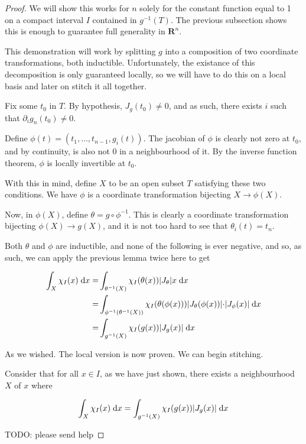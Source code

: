 \documentclass[11pt]{article}
\theoremstyle{definition}
\theoremstyle{plain}
\newcommand{\R}{\mathbf{R}}
\newcommand{\mo}{^{-1}}
\begin{document}
\begin{proof}
We will show this works for $n$ solely for the constant function equal to 1 on a compact interval $I$ contained in $g\mo(T)$. The previous subsection shows this is enough to guarantee full generality in $\R^n$.

This demonstration will work by splitting $g$ into a composition of two coordinate transformations, both inductible. Unfortunately, the existance of this decomposition is only guaranteed locally, so we will have to do this on a local basis and later on stitch it all together.

Fix some $t_0$ in $T$. By hypothesis, $J_g(t_0) \neq 0$, and as such, there exists $i$ such that $\partial_i g_n(t_0) \neq 0$.

Define $\phi(t) = (t_1, \ldots, t_{n-1}, g_i(t))$. The jacobian of $\phi$ is clearly not zero at $t_0$, and by continuity, is also not 0 in a neighbourhood of it. By the inverse function theorem, $\phi$ is locally invertible at $t_0$.

With this in mind, define $X$ to be an open subset $T$ satisfying these two conditions. We have $\phi$ is a coordinate transformation bijecting $X \rightarrow \phi(X)$.

Now, in $\phi(X)$, define $\theta = g \circ \phi\mo$. This is clearly a coordinate transformation bijecting $\phi(X) \rightarrow g(X)$, and it is not too hard to see that $\theta_i(t) = t_n$. %

Both $\theta$ and $\phi$ are inductible, and none of the following is ever negative, and so, as such, we can apply the previous lemma twice here to get

\begin{align*}
\int_X \chi_I(x) \d x =& \int_{\theta\mo(X)} \chi_I(\theta(x)) \rvert J_{\theta} \lvert x \d x \\
=& \int_{\phi\mo(\theta\mo(X))} \chi_I(\theta(\phi(x))) \rvert J_{\theta}(\phi(x)) \lvert \cdot \rvert J_\phi(x) \lvert \d x \\
=& \int_{g\mo(X)} \chi_I(g(x)) \rvert J_g(x) \lvert \d x
\end{align*}

As we wished. The local version is now proven. We can begin stitching.

Consider that for all $x \in I$, as we have just shown, there exists a neighbourhood $X$ of $x$ where

\[ \int_X \chi_I(x) \d x = \int_{g\mo(X)} \chi_I(g(x)) \rvert J_g(x) \lvert \d x \]

TODO: please send help

\end{proof}
\end{document}
